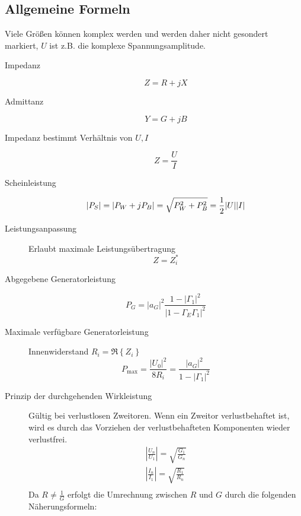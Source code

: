 \subsection*{Allgemeine Formeln}
Viele Größen können komplex werden und werden daher nicht gesondert markiert, $U$ ist z.B. die komplexe Spannungsamplitude.

\begin{description}
\item[Impedanz]
\begin{equation*}
Z = R + jX
\end{equation*}

\item[Admittanz]
\begin{equation*}
Y = G + jB
\end{equation*}

\item[Impedanz bestimmt Verhältnis von $U,I$]
\begin{equation*}
Z = \frac{U}{I}
\end{equation*}

\item[Scheinleistung]
\begin{equation*}
|P_S| = \left\vert P_W + j P_B \right\vert = \sqrt{P_W^2 + P_B^2} = \frac{1}{2} |U||I|\\
\end{equation*}

\item[Leistungsanpassung] Erlaubt maximale Leistungsübertragung
\begin{equation*}
Z = Z^*_i
\end{equation*}

\item[Abgegebene Generatorleistung]
\begin{equation*}
P_G = |a_G|^2 \frac{1-|\Gamma_1|^2}{|1-\Gamma_E\Gamma_1|^2}
\end{equation*}

\item[Maximale verfügbare Generatorleistung] Innenwiderstand $R_i = \Re\left\{Z_i\right\}$
\begin{equation*}
P_\text{max} = \frac{|U_0|^2}{8R_i} = \frac{|a_G|^2}{1-|\Gamma_1|^2}
\end{equation*}

\item[Prinzip der durchgehenden Wirkleistung] Gültig bei verlustlosen Zweitoren. Wenn ein Zweitor verlustbehaftet ist, wird es durch das Vorziehen der verlustbehafteten Komponenten wieder verlustfrei.
\begin{align*}
\left\vert \frac{U_n}{U_1} \right\vert = \sqrt{\frac{G_1}{G_n}} \\
\left\vert \frac{I_n}{I_1} \right\vert = \sqrt{\frac{R_1}{R_n}} \\
\end{align*}
Da $R \neq \frac{1}{G}$ erfolgt die Umrechnung zwischen $R$ und $G$ durch die folgenden Näherungsformeln:


\end{description}
